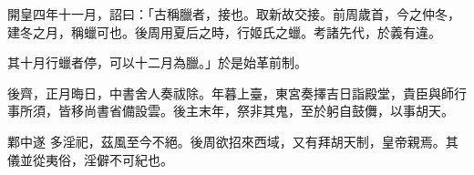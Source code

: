 \begin{pinyinscope}
 開皇四年十一月，詔曰：「古稱臘者，接也。取新故交接。前周歲首，今之仲冬，建冬之月，稱蠟可也。後周用夏后之時，行姬氏之蠟。考諸先代，於義有違。



 其十月行蠟者停，可以十二月為臘。」於是始革前制。



 後齊，正月晦日，中書舍人奏祓除。年暮上臺，東宮奏擇吉日詣殿堂，貴臣與師行事所須，皆移尚書省備設雲。後主末年，祭非其鬼，至於躬自鼓儛，以事胡天。



 鄴中遂
 多淫祀，茲風至今不絕。後周欲招來西域，又有拜胡天制，皇帝親焉。其儀並從夷俗，淫僻不可紀也。



\end{pinyinscope}